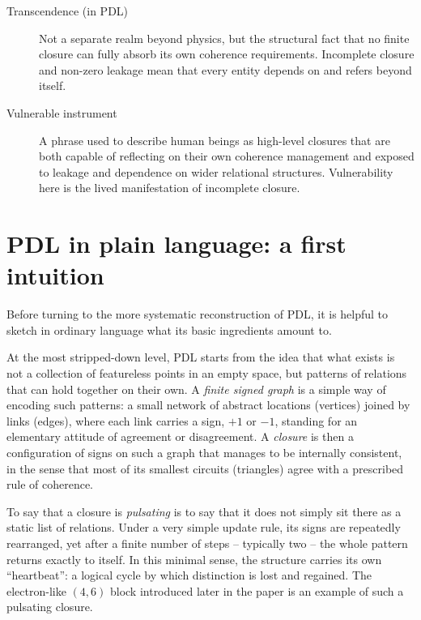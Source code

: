 \documentclass[11pt,a4paper]{article}
\theoremstyle{definition}
\begin{document}
\begin{description}
\item[Transcendence (in PDL)]
Not a separate realm beyond physics, but the structural fact that no finite closure can fully absorb its own coherence requirements. Incomplete closure and non-zero leakage mean that every entity depends on and refers beyond itself.\cite{Laubscher_Existence_PulsatingClosure_2026,Laubscher_PDL_TO_Dialogue_2024}

\item[Vulnerable instrument]
A phrase used to describe human beings as high-level closures that are both capable of reflecting on their own coherence management and exposed to leakage and dependence on wider relational structures. Vulnerability here is the lived manifestation of incomplete closure.\cite{Laubscher_Existence_PulsatingClosure_2026}

\end{description}

\section*{PDL in plain language: a first intuition}

Before turning to the more systematic reconstruction of PDL, it is helpful to sketch in ordinary language what its basic ingredients amount to.

At the most stripped-down level, PDL starts from the idea that what exists is not a collection of featureless points in an empty space, but patterns of relations that can hold together on their own. A \emph{finite signed graph} is a simple way of encoding such patterns: a small network of abstract locations (vertices) joined by links (edges), where each link carries a sign, $+1$ or $-1$, standing for an elementary attitude of agreement or disagreement. A \emph{closure} is then a configuration of signs on such a graph that manages to be internally consistent, in the sense that most of its smallest circuits (triangles) agree with a prescribed rule of coherence.

To say that a closure is \emph{pulsating} is to say that it does not simply sit there as a static list of relations. Under a very simple update rule, its signs are repeatedly rearranged, yet after a finite number of steps -- typically two -- the whole pattern returns exactly to itself. In this minimal sense, the structure carries its own ``heartbeat'': a logical cycle by which distinction is lost and regained. The electron-like $(4,6)$ block introduced later in the paper is an example of such a pulsating closure.
\end{document}
